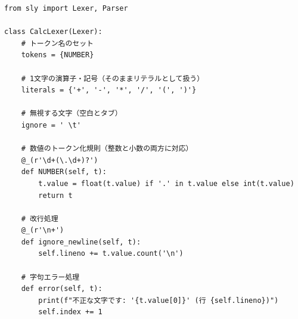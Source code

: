 \documentclass{jarticle}
\begin{document}
\begin{Verbatim}
from sly import Lexer, Parser

class CalcLexer(Lexer):
    # トークン名のセット
    tokens = {NUMBER}

    # 1文字の演算子・記号（そのままリテラルとして扱う）
    literals = {'+', '-', '*', '/', '(', ')'}

    # 無視する文字（空白とタブ）
    ignore = ' \t'

    # 数値のトークン化規則（整数と小数の両方に対応）
    @_(r'\d+(\.\d+)?')
    def NUMBER(self, t):
        t.value = float(t.value) if '.' in t.value else int(t.value)
        return t

    # 改行処理
    @_(r'\n+')
    def ignore_newline(self, t):
        self.lineno += t.value.count('\n')

    # 字句エラー処理
    def error(self, t):
        print(f"不正な文字です: '{t.value[0]}' (行 {self.lineno})")
        self.index += 1
\end{Verbatim}
\end{document}
